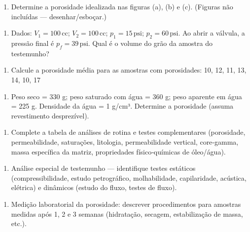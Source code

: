 \documentclass[11pt,a4paper]{article}
\begin{document}
\begin{enumerate}
\item Determine a porosidade idealizada nas figuras (a), (b) e (c). (Figuras não incluídas — desenhar/esboçar.)
\end{enumerate}

\begin{enumerate}
\item Dados: $V_1=100\,$cc; $V_2=100\,$cc; $p_1=15{\,}\text{psi}$; $p_2=60{\,}\text{psi}$. Ao abrir a válvula, a pressão final é $p_f=39{\,}\text{psi}$. Qual é o volume do grão da amostra do testemunho?
\end{enumerate}

\begin{enumerate}
\item Calcule a porosidade média para as amostras com porosidades: 10, 12, 11, 13, 14, 10, 17%
\end{enumerate}

\begin{enumerate}
\item Peso seco = 330 g; peso saturado com água = 360 g; peso aparente em água = 225 g. Densidade da água = 1 g/cm³. Determine a porosidade (assuma revestimento desprezível).
\end{enumerate}

\begin{enumerate}
\item Complete a tabela de análises de rotina e testes complementares (porosidade, permeabilidade, saturações, litologia, permeabilidade vertical, core‑gamma, massa específica da matriz, propriedades físico‑químicas de óleo/água).
\end{enumerate}

\begin{enumerate}
\item Análise especial de testemunho — identifique testes estáticos (compressibilidade, estudo petrográfico, molhabilidade, capilaridade, acústica, elétrica) e dinâmicos (estudo do fluxo, testes de fluxo).
\end{enumerate}

\begin{enumerate}
\item Medição laboratorial da porosidade: descrever procedimentos para amostras medidas após 1, 2 e 3 semanas (hidratação, secagem, estabilização de massa, etc.).
\end{enumerate}
\end{document}
